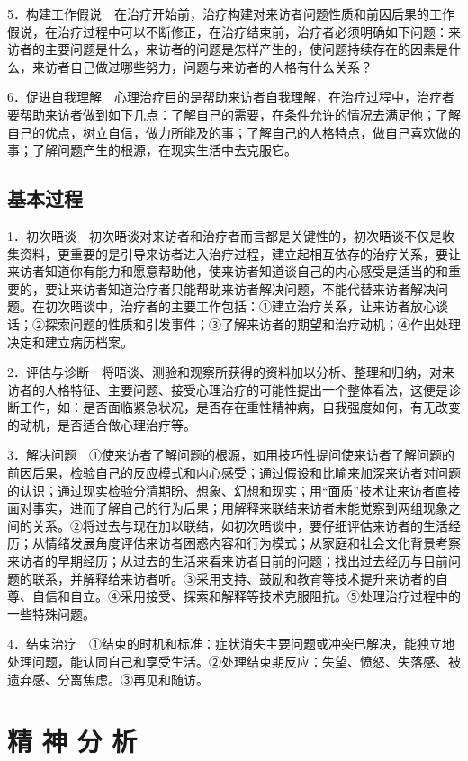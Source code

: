 5．构建工作假说　在治疗开始前，治疗构建对来访者问题性质和前因后果的工作假说，在治疗过程中可以不断修正，在治疗结束前，治疗者必须明确如下问题：来访者的主要问题是什么，来访者的问题是怎样产生的，使问题持续存在的因素是什么，来访者自己做过哪些努力，问题与来访者的人格有什么关系？

6．促进自我理解　心理治疗目的是帮助来访者自我理解，在治疗过程中，治疗者要帮助来访者做到如下几点：了解自己的需要，在条件允许的情况去满足他；了解自己的优点，树立自信，做力所能及的事；了解自己的人格特点，做自己喜欢做的事；了解问题产生的根源，在现实生活中去克服它。

\subsection{基本过程}

1．初次晤谈　初次晤谈对来访者和治疗者而言都是关键性的，初次晤谈不仅是收集资料，更重要的是引导来访者进入治疗过程，建立起相互依存的治疗关系，要让来访者知道你有能力和愿意帮助他，使来访者知道谈自己的内心感受是适当的和重要的，要让来访者知道治疗者只能帮助来访者解决问题，不能代替来访者解决问题。在初次晤谈中，治疗者的主要工作包括：①建立治疗关系，让来访者放心谈话；②探索问题的性质和引发事件；③了解来访者的期望和治疗动机；④作出处理决定和建立病历档案。

2．评估与诊断　将晤谈、测验和观察所获得的资料加以分析、整理和归纳，对来访者的人格特征、主要问题、接受心理治疗的可能性提出一个整体看法，这便是诊断工作，如：是否面临紧急状况，是否存在重性精神病，自我强度如何，有无改变的动机，是否适合做心理治疗等。

3．解决问题　①使来访者了解问题的根源，如用技巧性提问使来访者了解问题的前因后果，检验自己的反应模式和内心感受；通过假设和比喻来加深来访者对问题的认识；通过现实检验分清期盼、想象、幻想和现实；用“面质”技术让来访者直接面对事实，进而了解自己的行为后果；用解释来联结来访者未能觉察到两组现象之间的关系。②将过去与现在加以联结，如初次晤谈中，要仔细评估来访者的生活经历；从情绪发展角度评估来访者困惑内容和行为模式；从家庭和社会文化背景考察来访者的早期经历；从过去的生活来看来访者目前的问题；找出过去经历与目前问题的联系，并解释给来访者听。③采用支持、鼓励和教育等技术提升来访者的自尊、自信和自立。④采用接受、探索和解释等技术克服阻抗。⑤处理治疗过程中的一些特殊问题。

4．结束治疗　①结束的时机和标准：症状消失主要问题或冲突已解决，能独立地处理问题，能认同自己和享受生活。②处理结束期反应：失望、愤怒、失落感、被遗弃感、分离焦虑。③再见和随访。


\section{精 神 分 析}

